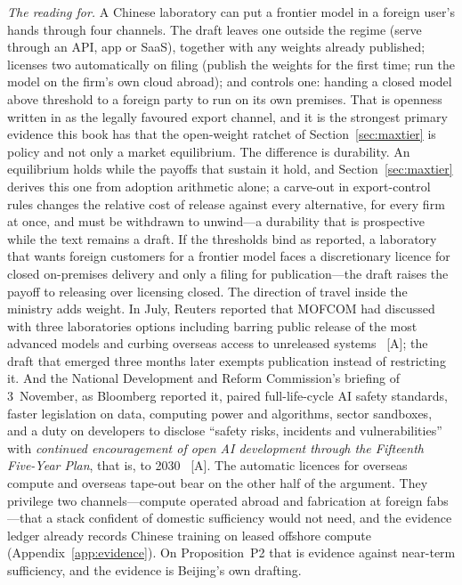 \emph{The reading for.} A Chinese laboratory can put a frontier model in a foreign user's hands through four channels. The draft leaves one outside the regime (serve through an API, app or SaaS), together with any weights already published; licenses two automatically on filing (publish the weights for the first time; run the model on the firm's own cloud abroad); and controls one: handing a closed model above threshold to a foreign party to run on its own premises. That is openness written in as the legally favoured export channel, and it is the strongest primary evidence this book has that the open-weight ratchet of Section~\ref{sec:maxtier} is policy and not only a market equilibrium. The difference is durability. An equilibrium holds while the payoffs that sustain it hold, and Section~\ref{sec:maxtier} derives this one from adoption arithmetic alone; a carve-out in export-control rules changes the relative cost of release against every alternative, for every firm at once, and must be withdrawn to unwind---a durability that is prospective while the text remains a draft. If the thresholds bind as reported, a laboratory that wants foreign customers for a frontier model faces a discretionary licence for closed on-premises delivery and only a filing for publication---the draft raises the payoff to releasing over licensing closed. The direction of travel inside the ministry adds weight. In July, Reuters reported that MOFCOM had discussed with three laboratories options including barring public release of the most advanced models and curbing overseas access to unreleased systems~\cite{mofcom-model-curbs} [A]; the draft that emerged three months later exempts publication instead of restricting it. And the National Development and Reform Commission's briefing of 3~November, as Bloomberg reported it, paired full-life-cycle AI safety standards, faster legislation on data, computing power and algorithms, sector sandboxes, and a duty on developers to disclose ``safety risks, incidents and vulnerabilities'' with \emph{continued encouragement of open AI development through the Fifteenth Five-Year Plan}, that is, to 2030~\cite{gov-ndrc-briefing} [A]. The automatic licences for overseas compute and overseas tape-out bear on the other half of the argument. They privilege two channels---compute operated abroad and fabrication at foreign fabs---that a stack confident of domestic sufficiency would not need, and the evidence ledger already records Chinese training on leased offshore compute (Appendix~\ref{app:evidence}). On Proposition~P2 that is evidence against near-term sufficiency, and the evidence is Beijing's own drafting.

